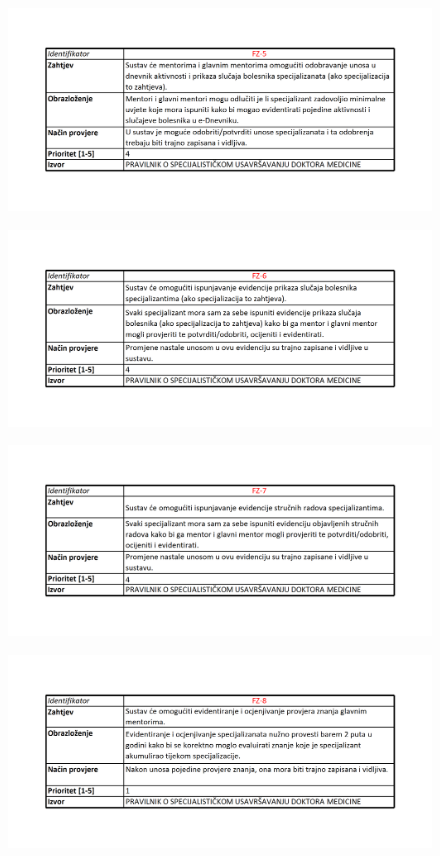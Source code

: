 \documentclass{scrreprt}
\begin{document}
\begin{figure}[h!]
    \centering
    \includegraphics[width=1\textwidth]{slike/5.png}
\end{figure}
\begin{figure}[h!]
    \centering
    \includegraphics[width=1\textwidth]{slike/6.png}
\end{figure}
\begin{figure}[h!]
    \centering
    \includegraphics[width=1\textwidth]{slike/7.png}
\end{figure}
\begin{figure}[h!]
    \centering
    \includegraphics[width=1\textwidth]{slike/8.png}
\end{figure}
\end{document}
